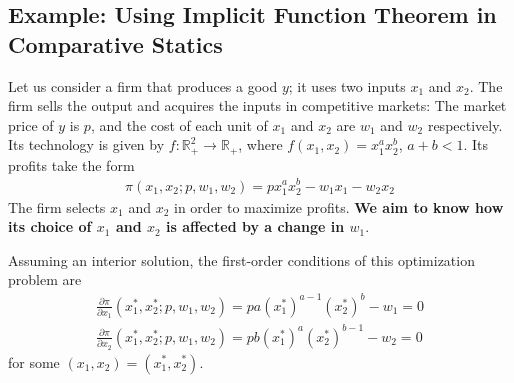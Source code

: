 \documentclass[11pt]{elegantbook}
\begin{document}
\subsection{Example: Using Implicit Function Theorem in Comparative Statics}
\begin{example}
    Let us consider a firm that produces a good $y$; it uses two inputs $x_1$ and $x_2$. The firm sells the output and acquires the inputs in competitive markets: The market price of $y$ is $p$, and the cost of each unit of $x_1$ and $x_2$ are $w_1$ and $w_2$ respectively. Its technology is given by $f : \mathbb{R}^2_+ \rightarrow \mathbb{R}_+$, where $f (x_1, x_2) = x_1^ax_2^b$, $a + b < 1$. Its profits take the form
    \begin{equation}
        \begin{aligned}
            \pi(x_1,x_2; p, w_1,w_2)=p x_1^ax_2^b-w_1x_1-w_2x_2
        \end{aligned}
        \nonumber
    \end{equation}
    The firm selects $x_1$ and $x_2$ in order to maximize profits. \textbf{We aim to know how its choice of $x_1$ and $x_2$ is affected by a change in $w_1$}.

    Assuming an interior solution, the first-order conditions of this optimization problem are
    \begin{equation}
        \begin{aligned}
            \frac{\partial \pi}{\partial x_1}(x_1^*,x_2^*;p,w_1,w_2)=pa(x_1^*)^{a-1}(x_2^*)^b-w_1=0\\
            \frac{\partial \pi}{\partial x_2}(x_1^*,x_2^*;p,w_1,w_2)=pb(x_1^*)^{a}(x_2^*)^{b-1}-w_2=0
        \end{aligned}
        \nonumber
    \end{equation}
    for some $(x_1, x_2) = (x_1^*,x_2^*)$.


\end{example}
\end{document}
